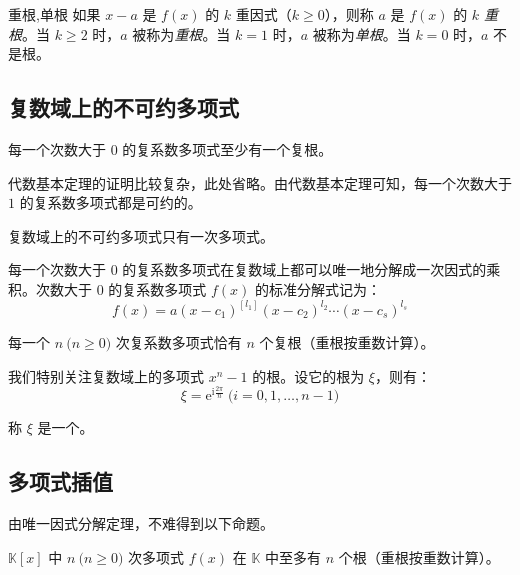 \begin{definition}{重根,单根}
	如果 $x - a$ 是 $f(x)$ 的 $k$ 重因式（$k \ge 0$），则称 $a$ 是 $f(x)$ 的 \emph{$k$ 重根}。当 $ k \ge 2$ 时，$a$ 被称为\emph{重根}。当 $k = 1$ 时，$a$ 被称为\emph{单根}。当 $k = 0$ 时，$a$ 不是根。
\end{definition}

\subsection{复数域上的不可约多项式}

\begin{theorem}[代数基本定理]
	每一个次数大于 $0$ 的复系数多项式至少有一个复根。
\end{theorem}

代数基本定理的证明比较复杂，此处省略。由代数基本定理可知，每一个次数大于 $1$ 的复系数多项式都是可约的。

\begin{proposition}
	复数域上的不可约多项式只有一次多项式。
\end{proposition}

\begin{theorem}[复系数多项式唯一因式分解定理]
	每一个次数大于 $0$ 的复系数多项式在复数域上都可以唯一地分解成一次因式的乘积。次数大于 $0$ 的复系数多项式 $f(x)$ 的标准分解式记为：
	$$
	f(x) = a (x - c_1)^[l_1] (x - c_2)^{l_2} \cdots (x - c_s)^{l_s}
	$$
\end{theorem}

\begin{proposition}
	每一个 $n \pod{n \ge 0}$ 次复系数多项式恰有 $n$ 个复根（重根按重数计算）。
\end{proposition}

我们特别关注复数域上的多项式 $x^n - 1$ 的根。设它的根为 $\xi$，则有：
$$
\xi = \mathrm e^{\mathrm i \frac{2 \pi}{n}} \pod{i = 0, 1, \ldots, n - 1}
$$

称 $\xi$ 是一个\emph{}。

\subsection{多项式插值}

由唯一因式分解定理，不难得到以下命题。

\begin{proposition}
	$\mathbb K[x]$ 中 $n \pod{n \ge 0}$ 次多项式 $f(x)$ 在 $\mathbb K$ 中至多有 $n$ 个根（重根按重数计算）。
\end{proposition}


